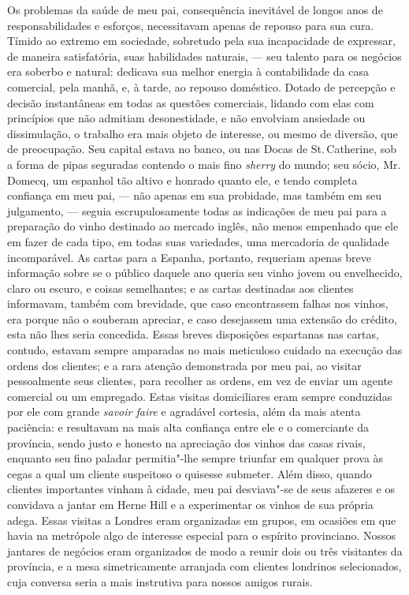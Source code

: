 Os problemas da saúde de meu pai, consequência inevitável de longos
anos de responsabilidades e esforços, necessitavam apenas de repouso
para sua cura. Tímido ao extremo em sociedade, sobretudo pela sua
incapacidade de expressar, de maneira satisfatória, suas habilidades
naturais, --- seu talento para os negócios era soberbo e natural:
dedicava sua melhor energia à contabilidade da casa comercial, pela
manhã, e, à tarde, ao repouso doméstico. Dotado de percepção e decisão
instantâneas em todas as questões comerciais, lidando com elas com
princípios que não admitiam desonestidade, e não envolviam ansiedade ou
dissimulação, o trabalho era mais objeto de interesse, ou mesmo de
diversão, que de preocupação. Seu capital estava no banco, ou nas Docas
de St.\,Catherine, sob a forma de pipas seguradas contendo o mais fino
\textit{sherry} do mundo; seu sócio, Mr.\,Domecq, um espanhol tão altivo e
honrado quanto ele, e tendo completa confiança em meu pai, --- não apenas
em sua probidade, mas também em seu julgamento, --- seguia
escrupulosamente todas as indicações de meu pai para a preparação do
vinho destinado ao mercado inglês, não menos empenhado que ele em fazer
de cada tipo, em todas suas variedades, uma mercadoria de qualidade
incomparável. As cartas para a Espanha, portanto, requeriam apenas breve
informação sobre se o público daquele ano queria seu vinho jovem ou
envelhecido, claro ou escuro, e coisas semelhantes; e as cartas
destinadas aos clientes informavam, também com brevidade, que caso
encontrassem falhas nos vinhos, era porque não o souberam apreciar, e
caso desejassem uma extensão do crédito, esta não lhes seria concedida.
Essas breves disposições espartanas nas cartas, contudo, estavam sempre
amparadas no mais meticuloso cuidado na execução das ordens dos
clientes; e a rara atenção demonstrada por meu pai, ao visitar
pessoalmente seus clientes, para recolher as ordens, em vez de enviar um
agente comercial ou um empregado. Estas visitas domiciliares eram sempre
conduzidas por ele com grande \textit{savoir faire} e agradável cortesia,
além da mais atenta paciência: e resultavam na mais alta confiança entre
ele e o comerciante da província, sendo justo e honesto na apreciação
dos vinhos das casas rivais, enquanto seu fino paladar permitia"-lhe
sempre triunfar em qualquer prova às cegas a qual um cliente suspeitoso
o quisesse submeter. Além disso, quando clientes importantes vinham à
cidade, meu pai desviava"-se de seus afazeres e os convidava a jantar em
Herne Hill e a experimentar os vinhos de sua própria adega. Essas
visitas a Londres eram organizadas em grupos, em ocasiões em que havia
na metrópole algo de interesse especial para o espírito provinciano.
Nossos jantares de negócios eram organizados de modo a reunir dois ou
três visitantes da província, e a mesa simetricamente arranjada com
clientes londrinos selecionados, cuja conversa seria a mais instrutiva
para nossos amigos rurais.

